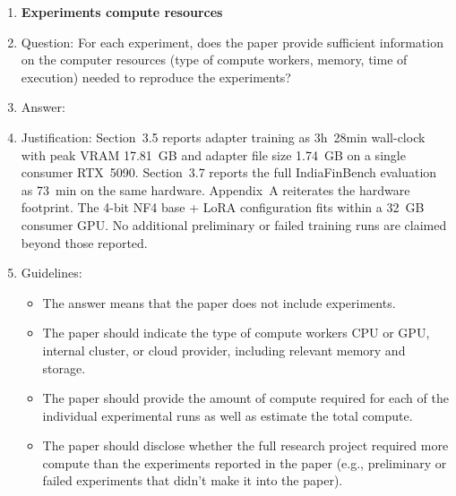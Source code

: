 \begin{enumerate}
\item {\bf Experiments compute resources}
    \item[] Question: For each experiment, does the paper provide sufficient information on the computer resources (type of compute workers, memory, time of execution) needed to reproduce the experiments?
    \item[] Answer: \answerYes{}
    \item[] Justification: Section~3.5 reports adapter training as 3h~28min wall-clock with peak VRAM 17.81~GB and adapter file size 1.74~GB on a single consumer RTX~5090. Section~3.7 reports the full IndiaFinBench evaluation as 73~min on the same hardware. Appendix~A reiterates the hardware footprint. The 4-bit NF4 base + LoRA configuration fits within a 32~GB consumer GPU. No additional preliminary or failed training runs are claimed beyond those reported.
    \item[] Guidelines:
    \begin{itemize}
        \item The answer \answerNA{} means that the paper does not include experiments.
        \item The paper should indicate the type of compute workers CPU or GPU, internal cluster, or cloud provider, including relevant memory and storage.
        \item The paper should provide the amount of compute required for each of the individual experimental runs as well as estimate the total compute.
        \item The paper should disclose whether the full research project required more compute than the experiments reported in the paper (e.g., preliminary or failed experiments that didn't make it into the paper).
    \end{itemize}


\end{enumerate}
